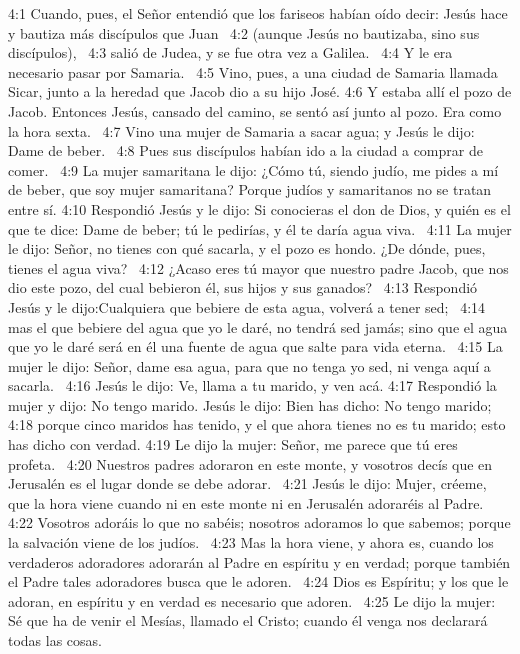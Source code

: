 4:1 Cuando, pues, el Señor entendió que los fariseos habían oído decir: Jesús hace y bautiza más discípulos que Juan  
4:2 (aunque Jesús no bautizaba, sino sus discípulos),  
4:3 salió de Judea, y se fue otra vez a Galilea.  
4:4 Y le era necesario pasar por Samaria.  
4:5 Vino, pues, a una ciudad de Samaria llamada Sicar, junto a la heredad que Jacob dio a su hijo José. 
4:6 Y estaba allí el pozo de Jacob. Entonces Jesús, cansado del camino, se sentó así junto al pozo. Era como la hora sexta.  
4:7 Vino una mujer de Samaria a sacar agua; y Jesús le dijo: Dame de beber.  
4:8 Pues sus discípulos habían ido a la ciudad a comprar de comer.  
4:9 La mujer samaritana le dijo: ¿Cómo tú, siendo judío, me pides a mí de beber, que soy mujer samaritana? Porque judíos y samaritanos no se tratan entre sí. 
4:10 Respondió Jesús y le dijo: Si conocieras el don de Dios, y quién es el que te dice: Dame de beber; tú le pedirías, y él te daría agua viva.  
4:11 La mujer le dijo: Señor, no tienes con qué sacarla, y el pozo es hondo. ¿De dónde, pues, tienes el agua viva?  
4:12 ¿Acaso eres tú mayor que nuestro padre Jacob, que nos dio este pozo, del cual bebieron él, sus hijos y sus ganados?  
4:13 Respondió Jesús y le dijo:Cualquiera que bebiere de esta agua, volverá a tener sed;  
4:14 mas el que bebiere del agua que yo le daré, no tendrá sed jamás; sino que el agua que yo le daré será en él una fuente de agua que salte para vida eterna.  
4:15 La mujer le dijo: Señor, dame esa agua, para que no tenga yo sed, ni venga aquí a sacarla.  
4:16 Jesús le dijo: Ve, llama a tu marido, y ven acá. 
4:17 Respondió la mujer y dijo: No tengo marido. Jesús le dijo: Bien has dicho: No tengo marido;  
4:18 porque cinco maridos has tenido, y el que ahora tienes no es tu marido; esto has dicho con verdad. 
4:19 Le dijo la mujer: Señor, me parece que tú eres profeta.  
4:20 Nuestros padres adoraron en este monte, y vosotros decís que en Jerusalén es el lugar donde se debe adorar.  
4:21 Jesús le dijo: Mujer, créeme, que la hora viene cuando ni en este monte ni en Jerusalén adoraréis al Padre.  
4:22 Vosotros adoráis lo que no sabéis; nosotros adoramos lo que sabemos; porque la salvación viene de los judíos.  
4:23 Mas la hora viene, y ahora es, cuando los verdaderos adoradores adorarán al Padre en espíritu y en verdad; porque también el Padre tales adoradores busca que le adoren.  
4:24 Dios es Espíritu; y los que le adoran, en espíritu y en verdad es necesario que adoren.  
4:25 Le dijo la mujer: Sé que ha de venir el Mesías, llamado el Cristo; cuando él venga nos declarará todas las cosas.  

